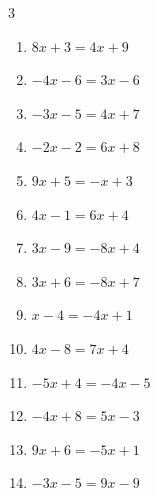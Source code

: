 \begin{multicols}{3}
\begin{enumerate}
  \item $8x+3=4x+9$


  \item $-4x-6=3x-6$

        \phantom{$\displaystyle x=0$}

  \item $-3x-5=4x+7$


  \item $-2x-2=6x+8$


  \item $9x+5=-x+3$


  \item $4x-1=6x+4$


  \item $3x-9=-8x+4$


  \item $3x+6=-8x+7$


  \item $x-4=-4x+1$

        \phantom{$\displaystyle x=1$}

  \item $4x-8=7x+4$

        \phantom{$\displaystyle x=-4$}

  \item $-5x+4=-4x-5$

        \phantom{$\displaystyle x=9$}

\columnbreak %

  \item $-4x+8=5x-3$


  \item $9x+6=-5x+1$


  \item $-3x-5=9x-9$


\end{enumerate}
\end{multicols}
